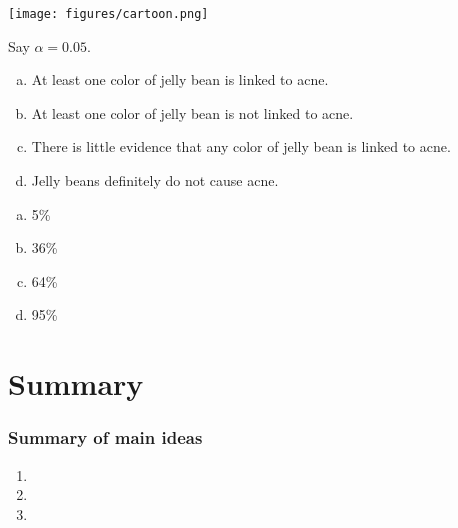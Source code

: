 \documentclass[11pt,containsverbatim,handout,xcolor=xelatex,dvipsnames,table]{beamer}
\newcommand{\solnMultOn}[3]{#3}
\begin{document}

\begin{frame}

\centering
\texttt{[image: figures/cartoon.png]}

\end{frame}


\begin{frame}

Say $\alpha = 0.05$.

\begin{enumerate}[(a)]
\item At least one color of jelly bean is linked to acne.
\item At least one color of jelly bean is not linked to acne.
\item \solnMultOn{1}{2}{There is little evidence that any color of jelly bean is linked to acne.}
\item Jelly beans definitely do not cause acne.
\end{enumerate}

\pause \pause

\begin{enumerate}[(a)]
\item \solnMultOn{3}{4}{5\%}
\item 36\%
\item 64\%
\item 95\%
\end{enumerate}

\end{frame}


\begin{frame}

\vfill


\vfill

\end{frame}


\section{Summary}


\begin{frame}
\frametitle{Summary of main ideas}

\vfill

\begin{enumerate}

\item {}

\item {}

\item {}

\end{enumerate}

\vfill

\end{frame}

\end{document}

